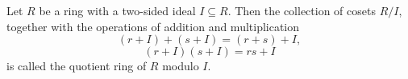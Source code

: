 \begin{definition}\label{dfn:idk}
	Let $R$ be a ring with a two-sided ideal $I\subseteq R$. Then the collection of cosets $R/I$, together with the operations of addition and multiplication
	\[
		(r+I)+(s+I)=(r+s)+I,
	\]
	\[
		(r+I)(s+I)=rs+I
	\]
	is called the quotient ring of $R$ modulo $I$.
\end{definition}

